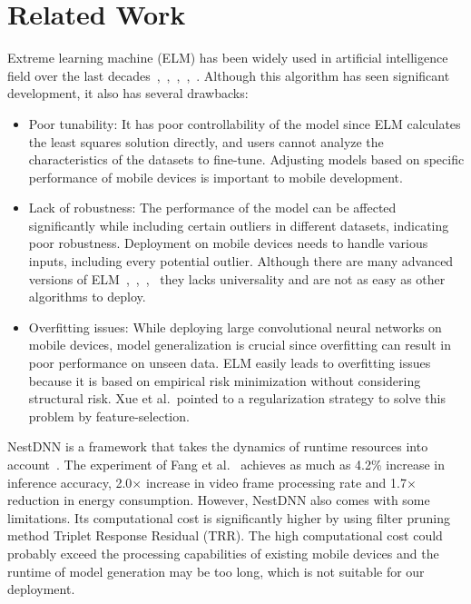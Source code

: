 \documentclass[runningheads]{llncs}
\begin{document}
\section{Related Work}\label{related_work}

Extreme learning machine (ELM) has been widely used in artificial intelligence field over the last decades~\cite{anton2021elm},~\cite{ding2014elmapp},~\cite{wang2022elmapp},~\cite{deng2015elmapp},~\cite{huang2006elmapp}. Although this algorithm has seen significant development, it also has several drawbacks: 
\begin{itemize}
	\item Poor tunability: It has poor controllability of the model since ELM calculates the least squares solution directly, and users cannot analyze the characteristics of the datasets to fine-tune. Adjusting models based on specific performance of mobile devices is important to mobile development.
	\item Lack of robustness: The performance of the model can be affected significantly while including certain outliers in different datasets, indicating poor robustness. Deployment on mobile devices needs to handle various inputs, including every potential outlier. Although there are many advanced versions of ELM~\cite{john2015advancedelm},~\cite{zhang2015advancedelm},~\cite{zhu2005advancedelm},~\cite{sun2017advancedelm} they lacks universality and are not as easy as other algorithms to deploy.
	\item Overfitting issues: While deploying large convolutional neural networks on mobile devices, model generalization is crucial since overfitting can result in poor performance on unseen data. ELM easily leads to overfitting issues because it is based on empirical risk minimization without considering structural risk. Xue et al.~\cite{ying2019overfit}pointed to a regularization strategy to solve this problem by feature-selection.
\end{itemize}	 

NestDNN is a framework that takes the dynamics of runtime resources into account~\cite{fang2018nestdnn}. The experiment of Fang et al.~\cite{fang2018nestdnn} achieves as much as 4.2\% increase in inference accuracy, 2.0× increase in video frame processing rate and 1.7× reduction in energy consumption. However, NestDNN also comes with some limitations. Its computational cost is significantly higher by using filter pruning method Triplet Response Residual (TRR). The high computational cost could probably exceed the processing capabilities of existing mobile devices and the runtime of model generation may be too long, which is not suitable for our deployment. 
\end{document}
